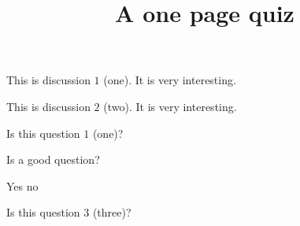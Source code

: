 \documentclass[onepage]{webquiz}
\title{A one page quiz}
\begin{document}
  \begin{discussion}
        This is discussion $1$ (one). It is very interesting.
  \end{discussion}
  \begin{discussion}
     This is discussion $2$ (two). It is very interesting.
  \end{discussion}
  \begin{question} Is this question $1$ (one)? \end{question}
  \begin{question} Is a good question?
    \begin{choice}\correct Yes \incorrect no\end{choice}
  \end{question}
  \begin{question} Is this question $3$ (three)? \end{question}
\end{document}
